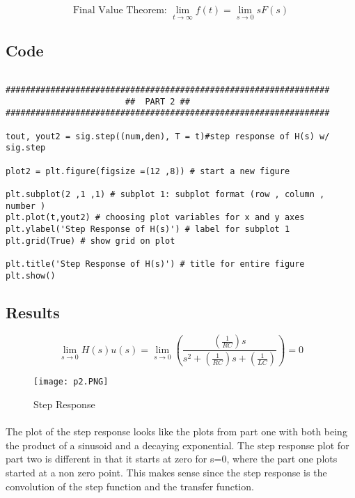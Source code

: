 \[\text{Final Value Theorem: }\lim_{t \to \infty}f(t)=\lim_{s \to 0}sF(s)\]


\subsection{Code}
\begin{scriptsize}
\begin{lstlisting}

#################################################################
                        ##  PART 2 ##
#################################################################

tout, yout2 = sig.step((num,den), T = t)#step response of H(s) w/ sig.step

plot2 = plt.figure(figsize =(12 ,8)) # start a new figure 

plt.subplot(2 ,1 ,1) # subplot 1: subplot format (row , column , number )
plt.plot(t,yout2) # choosing plot variables for x and y axes
plt.ylabel('Step Response of H(s)') # label for subplot 1
plt.grid(True) # show grid on plot

plt.title('Step Response of H(s)') # title for entire figure
plt.show()

\end{lstlisting}
\end{scriptsize}

\subsection{Results}

\[ \lim_{s \to 0}H(s)u(s)= \lim_{s \to 0} (\dfrac{(\frac{1}{RC})s}{s^{2}+(\frac{1}{RC})s+(\frac{1}{LC})})=0\]

 \begin{figure}[H]
	   \centering
	   \texttt{[image: p2.PNG]}
	   \caption{Step Response}
 \end{figure}
 
\paragraph{}
The plot of the step response looks like the plots from part one with both being the product of a sinusoid and a decaying exponential.  The step response plot for part two is different in that it starts at zero for s=0, where the part one plots started at a non zero point.  This makes sense since the step response is the convolution of the step function and the transfer function.

